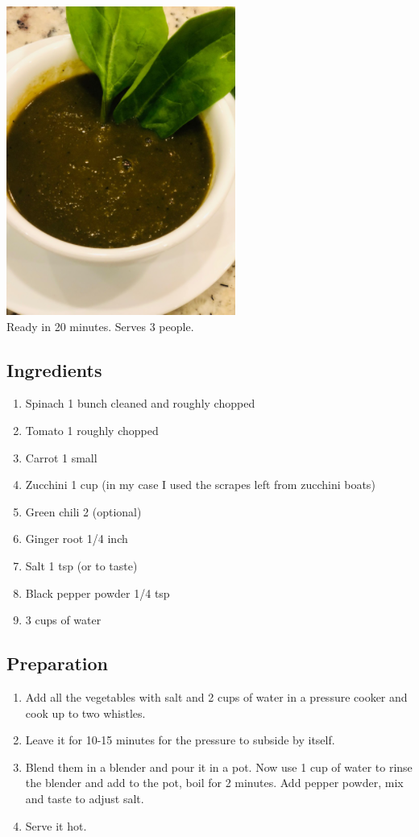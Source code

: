 \documentclass[
  oneside]{book}
\begin{document}
\includegraphics{pictures/spinach-soup.png}\\
Ready in 20 minutes. Serves 3 people.

\hypertarget{ingredients-2}{%
\subsection{Ingredients}\label{ingredients-2}}

\begin{enumerate}
\def\labelenumi{\arabic{enumi}.}
\item
  Spinach 1 bunch cleaned and roughly chopped
\item
  Tomato 1 roughly chopped
\item
  Carrot 1 small
\item
  Zucchini 1 cup (in my case I used the scrapes left from zucchini boats)
\item
  Green chili 2 (optional)
\item
  Ginger root 1/4 inch
\item
  Salt 1 tsp (or to taste)
\item
  Black pepper powder 1/4 tsp
\item
  3 cups of water
\end{enumerate}

\hypertarget{preparation-2}{%
\subsection{Preparation}\label{preparation-2}}

\begin{enumerate}
\def\labelenumi{\arabic{enumi}.}
\item
  Add all the vegetables with salt and 2 cups of water in a pressure cooker and cook up to two whistles.
\item
  Leave it for 10-15 minutes for the pressure to subside by itself.
\item
  Blend them in a blender and pour it in a pot. Now use 1 cup of water to rinse the blender and add to the pot, boil for 2 minutes. Add pepper powder, mix and taste to adjust salt.
\item
  Serve it hot.
\end{enumerate}
\end{document}
